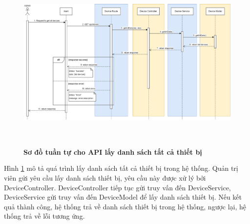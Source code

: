 \begin{figure}[H]
  \centering
  \includegraphics[width=16cm,height=9cm]{Images/sequence_api/getAllDevices.png}
  \caption[Sơ đồ tuần tự cho API lấy danh sách tất cả thiết bị ]{\bfseries \fontsize{12pt}{0pt}
  \selectfont Sơ đồ tuần tự cho API lấy danh sách tất cả thiết bị }
  \label{api_getAllDevices} %
\end{figure}
Hình \ref{api_getAllDevices} mô tả quá trình lấy danh sách tất cả thiết bị trong hệ thống. Quản trị viên gửi yêu cầu lấy danh sách thiết bị, 
yêu cầu này được xử lý bởi DeviceController. DeviceController tiếp tục gửi truy vấn đến DeviceService, DeviceService gửi truy vấn đến DeviceModel 
để lấy danh sách thiết bị. Nếu kết quả thành công, hệ thống trả về danh sách thiết bị trong hệ thống, ngược lại, hệ thống trả về lỗi tương ứng.


